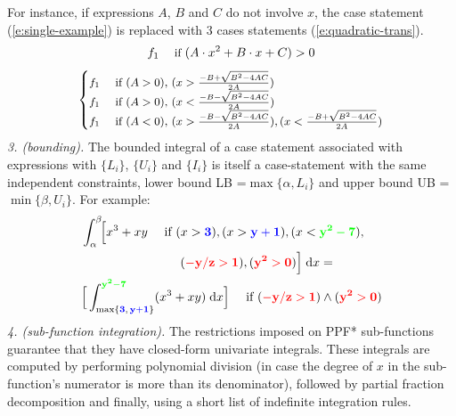 \documentclass[]{article}
\newcommand{\case}[2]{#2 &\text{ if } #1}%
\newcommand{\singlecase}[2]{#2 \quad \text{ if } #1}
\newcommand{\dd}{\;\mathrm{d}} %
\begin{document}
For instance, if expressions $A$, $B$ and $C$ do not involve $x$,
the case statement (\ref{e:single-example})
is replaced with 3 cases statements (\ref{e:quadratic-trans}).
\begin{equation}\footnotesize
\label{e:single-example}
\singlecase{(A \cdot x^2 + B \cdot x + C)>0}{f_1}
\end{equation}
\begin{align}\footnotesize
\label{e:quadratic-trans}
{
\begin{cases}
  \case{(A>0), \, (x> \frac{-B + \sqrt{B^2 - 4 A C}}{2 A}) }{f_1} \\ 
  \case{(A>0), \, (x< \frac{-B - \sqrt{B^2 - 4 A C}}{2 A}) }{f_1} \\ 
  \case{(A<0), \, (x> \frac{-B - \sqrt{B^2 - 4 A C}}{2 A}),
                              (x< \frac{-B + \sqrt{B^2 - 4 A C}}{2 A})}{f_1}
 \end{cases}
}
\end{align}
\emph{3. (bounding).} The bounded integral of a case statement 
associated with expressions with $\{L_i\}$, $\{U_i\}$ and $\{I_i\}$ 
is itself a case-statement with the same independent constraints,
 lower bound LB =$\max\{\alpha, L_i\}$ and 
 upper bound UB =$ \min\{\beta, U_i\}$.
For example:
\begin{align*}\footnotesize 
&\int_{\alpha}^{\beta}\!\! \Big[
\singlecase{(x>{\bf\color{blue}3}), (x>{\bf\color{blue}y+1}), (x<{\bf\color{green}y^2-7}), \\ 
&\hspace{28mm} ({\bf\color{red}-y/z > 1}) , ({\bf\color{red}y^2>0})}
{x^3 + xy} \Big] \dd x = \\
&\singlecase{({\bf\color{red}-y/z > 1}) \wedge ({\bf\color{red}y^2>0})}
{\Big[ \int_{\max\{{\bf {\color{blue}3}, \, {\color{blue}y+1}}\}}^{{\bf\color{green} y^2 - 7}} (x^3 + xy) \dd x \Big]} 
\end{align*}  
\emph{4. (sub-function integration).} %
The restrictions imposed on PPF* sub-functions 
guarantee that they have closed-form %
univariate integrals.
These integrals are computed by performing polynomial division 
(in case the degree of $x$ in the sub-function's numerator is more than its denominator),
followed by partial fraction decomposition and finally, using a short list of indefinite integration rules.
\end{document}
